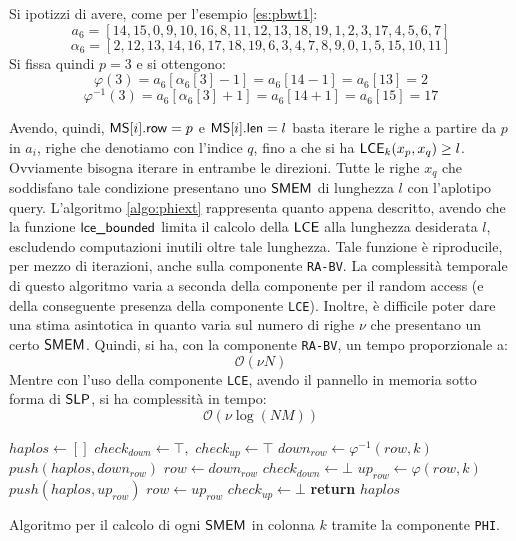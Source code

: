 \begin{esempio}
  Si ipotizzi di avere, come per l'esempio \ref{es:pbwt1}:
  \[a_6=[14,15,0,9,10,16,8,11,12,13,18,19,1,2,3,17,4,5,6,7]\]
  \[\alpha_6=[2,12,13,14,16,17,18,19,6,3,4,7,8,9,0,1,5,15,10,11]\]
  Si fissa quindi $p=3$ e si ottengono:
  \[\varphi(3)=a_6[\alpha_6[3]-1]=a_6[14-1]=a_6[13]=2\]
  \[\varphi^{-1}(3)=a_6[\alpha_6[3]+1]=a_6[14+1]=a_6[15]=17\]
\end{esempio}
Avendo, quindi, $\mbox{\rm {\sf MS}}[i].\mbox{\rm {\sf row}}=p$ e $\mbox{\rm {\sf MS}}[i].\mbox{\rm {\sf len}}=l$ basta iterare le righe a
partire da 
$p$ in $a_i$, righe che denotiamo con l'indice $q$, fino a che si ha 
$\mbox{\rm {\sf LCE}}_k(x_p, x_q)\geq l$. Ovviamente bisogna iterare in entrambe le
direzioni. Tutte le righe $x_q$ che soddisfano tale condizione presentano uno
$\mbox{\rm {\sf SMEM}}$ di lunghezza $l$ con 
l'aplotipo query. L'algoritmo \ref{algo:phiext} rappresenta quanto
appena descritto, avendo che la funzione $\mbox{\rm {\sf lce\_bounded}}$ limita il calcolo
della 
$\mbox{\rm {\sf LCE}}$ alla lunghezza desiderata $l$, escludendo computazioni inutili oltre tale
lunghezza. Tale funzione è riproducile, per mezzo di iterazioni, anche sulla
componente \texttt{RA-BV}. La complessità temporale di questo algoritmo
varia a seconda della componente per il random access (e della conseguente
presenza della 
componente \texttt{LCE}). Inoltre, è difficile poter dare una stima asintotica
in quanto varia sul numero di righe $\nu$ che presentano un certo
$\mbox{\rm {\sf SMEM}}$. Quindi, si ha, con la 
componente \texttt{RA-BV}, un tempo proporzionale a:
\begin{equation}
  \label{eq:phiaccbv}
  \mathcal{O}(\nu N)
\end{equation}
Mentre con l'uso della componente \texttt{LCE}, avendo il pannello in memoria
sotto forma di $\mbox{\rm {\sf SLP}}$, si ha complessità in tempo:
\begin{equation}
  \label{eq:phiaccbv2}
  \mathcal{O}(\nu\log (NM))
\end{equation}
\begin{algorithm}
  \small
  \begin{algorithmic}[1]
    \State $haplos\gets []$
    \State $check_{down}\gets \top,\,\,check_{up}\gets \top$
    \State $down_{row}\gets \varphi^{-1}(row, k)$
    \State $push(haplos, down_{row})$
    \State $row \gets down_{row}$
    \Else
    \State $check_{down}\gets \bot$
    \EndIf
    \EndWhile
    \State $up_{row}\gets \varphi(row, k)$
    \State $push(haplos, up_{row})$
    \State $row \gets up_{row}$
    \Else
    \State $check_{up}\gets \bot$
    \EndIf
    \EndWhile
    \State \textbf{return} $haplos$
    \EndFunction
  \end{algorithmic}
  \caption{\footnotesize{Algoritmo per il calcolo di ogni $\mbox{\rm {\sf SMEM}}$ in colonna $k$
  tramite la 
  componente \texttt{PHI}.}}
  \label{algo:phiext}
\end{algorithm}
